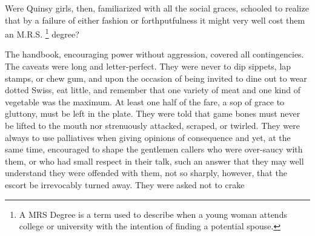   Were Quinsy girls, then, familiarized with all the social graces, schooled to
realize that by a failure of either fashion or forthputfulness 
it might very well cost them an M.R.S. 
\footnote{ A MRS Degree is a term used to describe when a young woman attends
college or university with the intention of finding a potential spouse.}
degree?

  The handbook, encouraging power without aggression, covered all contingencies.
The caveats were long and letter-perfect. They were never to dip sippets, 
lap
stamps, or chew gum, and upon the occasion of being invited to dine out to wear
dotted Swiss, eat little, and remember that one variety of meat and one kind of
vegetable was the maximum. At least one half of the fare, a sop 
of grace to gluttony, must be left in the plate. They were told that game 
bones must never be lifted to the mouth nor strenuously 
attacked, scraped, 
or twirled. 
They were always to use palliatives 
when giving opinions of consequence and yet, at the
same time, encouraged to shape the gentlemen callers who were over-saucy 
with them, or who had small respect in their talk, such an answer that they 
may well understand they were offended with them, not so sharply, however, 
that the escort be irrevocably turned away. They were asked not to crake 
